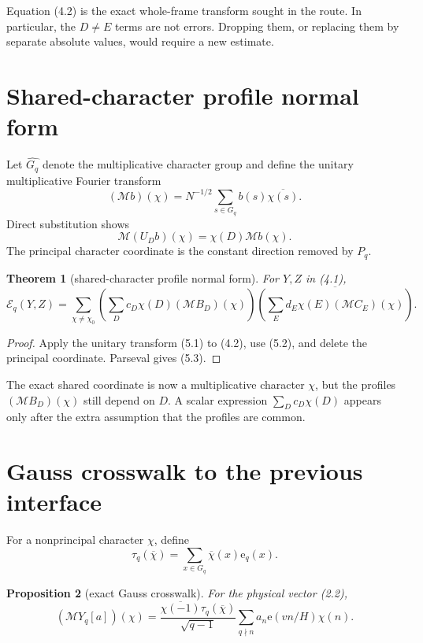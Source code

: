\documentclass[11pt]{article}
\newtheorem{theorem}{Theorem}[section]
\newtheorem{proposition}[theorem]{Proposition}
\newcommand{\e}{\mathrm e}
\newcommand{\Gq}{G_q}
\newcommand{\M}{\mathcal M}
\newcommand{\cE}{\mathcal E}
\begin{document}
Equation (4.2) is the exact whole-frame transform sought in the route.  In
particular, the $D\ne E$ terms are not errors.  Dropping them, or replacing
them by separate absolute values, would require a new estimate.

\section{Shared-character profile normal form}

Let $\widehat{\Gq}$ denote the multiplicative character group and define the
unitary multiplicative Fourier transform
\[
 (\M b)(\chi)=N^{-1/2}\sum_{s\in\Gq}b(s)\overline{\chi(s)}.
 \tag{5.1}
\]
Direct substitution shows
\[
 \M(U_Db)(\chi)=\chi(D)\M b(\chi).
 \tag{5.2}
\]
The principal character coordinate is the constant direction removed by
$P_q$.

\begin{theorem}[shared-character profile normal form]
\label{thm:character}
For $Y,Z$ in (4.1),
\[
 \boxed{
 \cE_q(Y,Z)=\sum_{\chi\ne\chi_0}
 \left(\sum_Dc_D\chi(D)(\M B_D)(\chi)\right)
 \overline{\left(\sum_Ed_E\chi(E)(\M C_E)(\chi)\right)}.}
 \tag{5.3}
\]
\end{theorem}

\begin{proof}
Apply the unitary transform (5.1) to (4.2), use (5.2), and delete the
principal coordinate.  Parseval gives (5.3).
\end{proof}

The exact shared coordinate is now a multiplicative character $\chi$, but
the profiles $(\M B_D)(\chi)$ still depend on $D$.  A scalar expression
$\sum_Dc_D\chi(D)$ appears only after the extra assumption that the profiles
are common.

\section{Gauss crosswalk to the previous interface}

For a nonprincipal character $\chi$, define
\[
 \tau_q(\overline\chi)=\sum_{x\in\Gq}\overline\chi(x)\e_q(x).
 \tag{6.1}
\]

\begin{proposition}[exact Gauss crosswalk]
\label{prop:gauss}
For the physical vector (2.2),
\[
 \boxed{
 (\M Y_q[a])(\chi)=
 \frac{\overline{\chi(-1)}\tau_q(\overline\chi)}{\sqrt{q-1}}
 \sum_{q\nmid n}a_n\e(vn/H)\chi(n).}
 \tag{6.2}
\]
\end{proposition}
\end{document}
